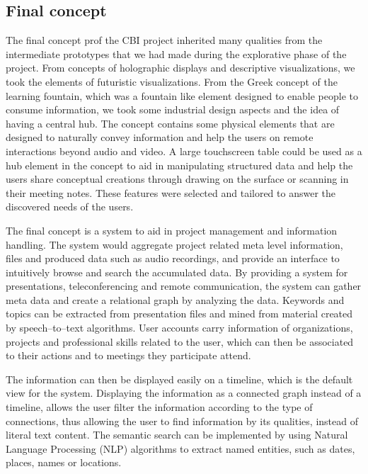 \documentclass[english,12pt,a4paper,dvips]{article}
\begin{document}
\subsection{Final concept}

The final concept prof the CBI project inherited many qualities from the intermediate prototypes that we had made during the explorative phase of the project. From concepts of holographic displays and descriptive visualizations, we took the elements of futuristic visualizations. From the Greek concept of the learning fountain, which was a fountain like element designed to enable people to consume information, we took some industrial design aspects and the idea of having a central hub. The concept contains some physical elements that are designed to naturally convey information and help the users on remote interactions beyond audio and video. A large touchscreen table could be used as a hub element in the concept to aid in manipulating structured data and help the users share conceptual creations through drawing on the surface or scanning in their meeting notes. These features were selected and tailored to answer the discovered needs of the users.

The final concept is a system to aid in project management and information handling. The system would aggregate project related meta level information, files and produced data such as audio recordings, and provide an interface to intuitively browse and search the accumulated data. By providing a system for presentations, teleconferencing and remote communication, the system can gather meta data and create a relational graph by analyzing the data. Keywords and topics can be extracted from presentation files and mined from material created by speech--to--text algorithms. User accounts carry information of organizations, projects and professional skills related to the user, which can then be associated to their actions and to meetings they participate attend.

The information can then be displayed easily on a timeline, which is the default view for the system. Displaying the information as a connected graph instead of a timeline, allows the user filter the information according to the type of connections, thus allowing the user to find information by its qualities, instead of literal text content. The semantic search can be implemented by using Natural Language Processing (NLP) algorithms to extract named entities, such as dates, places, names or locations.

\clearpage
\end{document}
